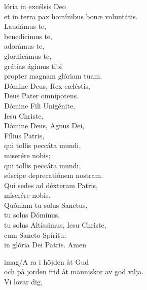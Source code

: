 \begin{multicols}{2}
\renewcommand{\columnseprulecolor}{\color{rubrica}}
\renewcommand{\columnseprule}{0.4pt}


 lória in excélsis Deo\\
et in terra pax homínibus
bonæ voluntátis.\\
Laudámus te,\\
benedícimus te,\\
adorámus te,\\
glorificámus te,\\
grátias ágimus tibi\\
propter magnam glóriam tuam,\\
Dómine Deus, Rex cæléstis,\\
Deus Pater omnípotens.\\
Dómine Fili Unigénite,\\
Iesu Christe,\\
Dómine Deus, Agnus Dei,\\
Fílius Patris,\\
qui tollis peccáta mundi,\\
miserére nobis;\\
qui tollis peccáta mundi,\\
súscipe deprecatiónem nostram.\\
Qui sedes ad déxteram Patris,\\
miserére nobis.\\
Quóniam tu solus Sanctus,\\
tu solus Dóminus,\\
tu solus Altíssimus, Iesu Christe,\\
cum Sancto Spíritu:\\
in glória Dei Patris. Amen


\columnbreak
\lettrine [image=true, lines=3, loversize=0.2] {imag/A}{} ra i höjden åt Gud\\
och på jorden frid
åt människor av god vilja.\\
{\color{micolor}Vi lovar dig, }\\

\vspace{-14 mm}


\end{multicols}
